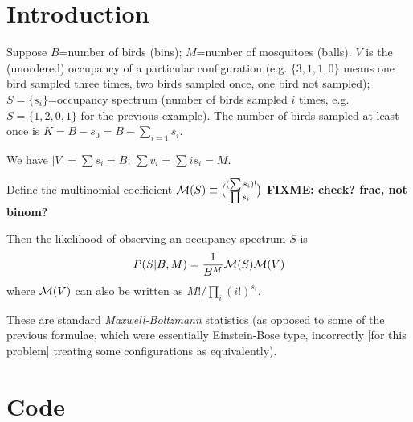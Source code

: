 \documentclass{article}\usepackage[]{graphicx}\usepackage[]{color}
\newcommand{\multinom}{{\cal M}}
\newcommand{\fixme}[1]{\textbf{FIXME: #1}}
\begin{document}
\section{Introduction}
Suppose $B$=number of birds (bins); $M$=number of mosquitoes (balls).
$V$ is the (unordered) occupancy of a particular configuration
(e.g. $\{3,1,1,0\}$ means one bird sampled three times, two
birds sampled once, one bird not sampled);
$S=\{s_i\}$=occupancy spectrum (number of birds sampled $i$ times,
e.g. $S=\{1,2,0,1\}$ for the previous example).
The number of birds sampled at least once is 
$K=B-s_0=B-\sum_{i=1} s_i$.

We have $|V| = \sum s_i=B$;  $\sum v_i = \sum i s_i = M$.

Define the multinomial coefficient $\multinom(S) \equiv 
\binom{(\sum s_i)!}{\prod s_i!}$ \fixme{check? frac, not binom?}

Then the likelihood of observing an occupancy spectrum $S$ is
\begin{equation}
P(S|B,M) =  \frac{1}{B^M} \multinom(S) \multinom(V)
\end{equation}
where $\multinom(V)$ can also be written as
$M!/\prod_i (i!)^{s_i}$.

These are standard \emph{Maxwell-Boltzmann} statistics (as opposed
to some of the previous formulae, which were essentially Einstein-Bose
type, incorrectly [for this problem] treating some configurations
as equivalently).

\section{Code}
\end{document}
